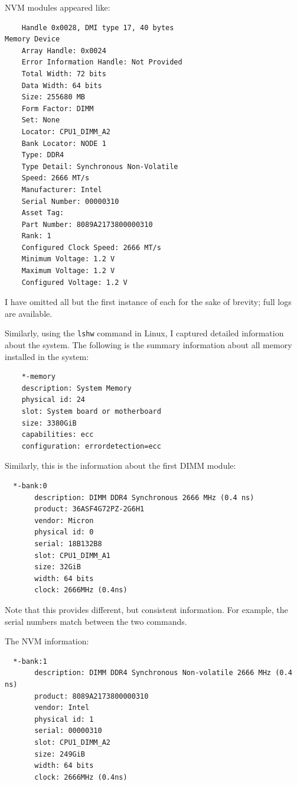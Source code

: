 NVM modules appeared like:

\begin{verbatim}
    Handle 0x0028, DMI type 17, 40 bytes
Memory Device
	Array Handle: 0x0024
	Error Information Handle: Not Provided
	Total Width: 72 bits
	Data Width: 64 bits
	Size: 255680 MB
	Form Factor: DIMM
	Set: None
	Locator: CPU1_DIMM_A2
	Bank Locator: NODE 1
	Type: DDR4
	Type Detail: Synchronous Non-Volatile
	Speed: 2666 MT/s
	Manufacturer: Intel
	Serial Number: 00000310
	Asset Tag:  
	Part Number: 8089A2173800000310  
	Rank: 1
	Configured Clock Speed: 2666 MT/s
	Minimum Voltage: 1.2 V
	Maximum Voltage: 1.2 V
	Configured Voltage: 1.2 V
\end{verbatim}

I have omitted all but the first instance of each for the sake of brevity; full logs are
available.

Similarly, using the \verb+lshw+ command in Linux, I captured detailed information about 
the system.  The following is the summary information about all memory installed in the
system:

\begin{verbatim}
    *-memory
    description: System Memory
    physical id: 24
    slot: System board or motherboard
    size: 3380GiB
    capabilities: ecc
    configuration: errordetection=ecc
\end{verbatim}

Similarly, this is the information about the first DIMM module:

\begin{verbatim}
  *-bank:0
       description: DIMM DDR4 Synchronous 2666 MHz (0.4 ns)
       product: 36ASF4G72PZ-2G6H1
       vendor: Micron
       physical id: 0
       serial: 18B132B8
       slot: CPU1_DIMM_A1
       size: 32GiB
       width: 64 bits
       clock: 2666MHz (0.4ns)
\end{verbatim}

Note that this provides different, but consistent information.  For example, the
serial numbers match between the two commands.

The NVM information:

\begin{verbatim}
  *-bank:1
       description: DIMM DDR4 Synchronous Non-volatile 2666 MHz (0.4 ns)
       product: 8089A2173800000310
       vendor: Intel
       physical id: 1
       serial: 00000310
       slot: CPU1_DIMM_A2
       size: 249GiB
       width: 64 bits
       clock: 2666MHz (0.4ns)
\end{verbatim}

